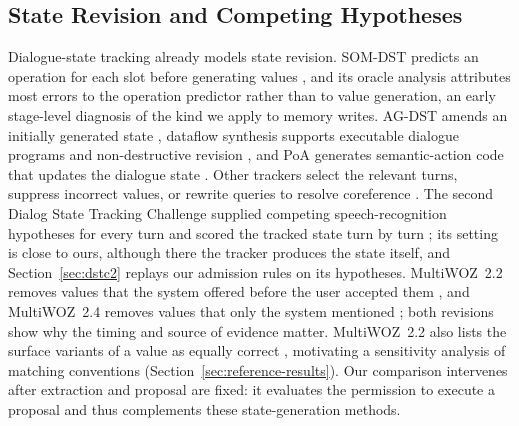 \documentclass[acmsmall,review,anonymous]{acmart}
\begin{document}
\subsection{State Revision and Competing Hypotheses}
Dialogue-state tracking already models state revision. SOM-DST predicts an operation for each slot before generating values \cite{cite14}, and its oracle analysis attributes most errors to the operation predictor rather than to value generation, an early stage-level diagnosis of the kind we apply to memory writes. AG-DST amends an initially generated state \cite{cite33}, dataflow synthesis supports executable dialogue programs and non-destructive revision \cite{cite3}, and PoA generates semantic-action code that updates the dialogue state \cite{cite31}. Other trackers select the relevant turns, suppress incorrect values, or rewrite queries to resolve coreference \cite{cite11,cite17,cite34}. The second Dialog State Tracking Challenge supplied competing speech-recognition hypotheses for every turn and scored the tracked state turn by turn \cite{cite12}; its setting is close to ours, although there the tracker produces the state itself, and Section~\ref{sec:dstc2} replays our admission rules on its hypotheses. MultiWOZ~2.2 removes values that the system offered before the user accepted them \cite{cite44}, and MultiWOZ~2.4 removes values that only the system mentioned \cite{cite42}; both revisions show why the timing and source of evidence matter. MultiWOZ~2.2 also lists the surface variants of a value as equally correct \cite{cite44}, motivating a sensitivity analysis of matching conventions (Section~\ref{sec:reference-results}). Our comparison intervenes after extraction and proposal are fixed: it evaluates the permission to execute a proposal and thus complements these state-generation methods.
\end{document}
